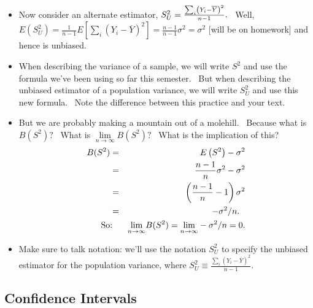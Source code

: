 \documentclass[11pt]{article}
\begin{document}
\begin{itemize}
\item Now consider an alternate estimator, $S_{U}^{2}=\frac{%
\sum\nolimits_{i}\left( Y_{i}-\overline{Y}\right) ^{2}}{n-1}.$ \ Well, $%
E\left( S_{U}^{2}\right) =\frac{1}{n-1}E\left[ \sum\nolimits_{i}\left( Y_{i}-%
\overline{Y}\right) ^{2}\right] =\frac{n-1}{n-1}\sigma ^{2}=\sigma ^{2}$
[will be on homework] and hence is unbiased. \ 

\item When describing the variance of a sample, we will write $S^{2}$ and
use the formula we've been using so far this semester. \ But when describing
the unbiased estimator of a population variance, we will write $S_{U}^{2}$
and use this new formula. \ Note the difference between this practice and
your text.

\item But we are probably making a mountain out of a molehill. \ Because
what is $B(S^{2})?$ \ What is $\underset{n\rightarrow \infty }{\lim }%
B(S^{2})?$ \ What is the implication of this?%
\begin{eqnarray*}
B(S^{2}) &=&E\left( S^{2}\right) -\sigma ^{2} \\
&=&\frac{n-1}{n}\sigma ^{2}-\sigma ^{2} \\
&=&\left( \frac{n-1}{n}-1\right) \sigma ^{2} \\
&=&-\sigma ^{2}/n.\text{ \ } \\
\text{So} &\text{:}&\underset{n\rightarrow \infty }{\lim }B(S^{2})=\underset{%
n\rightarrow \infty }{\lim }-\sigma ^{2}/n=0.
\end{eqnarray*}

\item Make sure to talk notation: we'll use the notation $S_{U}^{2}$ to
specify the unbiased estimator for the population variance, where $%
S_{U}^{2}\equiv \frac{\sum\nolimits_{i}\left( Y_{i}-\overline{Y}\right) ^{2}%
}{n-1}.$ \ 
\end{itemize}

\subsection{Confidence Intervals}
\end{document}
